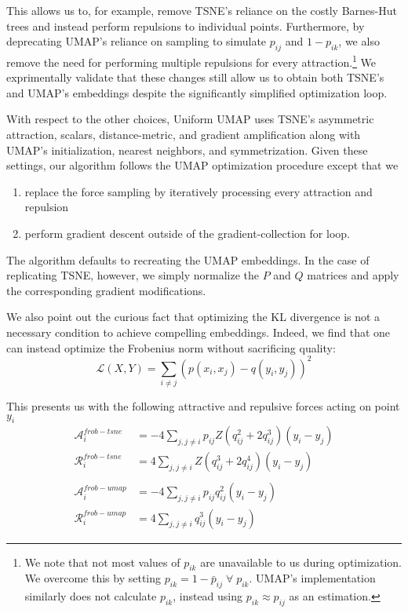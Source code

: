 \documentclass[sigconf, nonacm]{acmart}
\newcommand\ourmethod{Uniform UMAP }
\begin{document}
This allows us to, for example, remove TSNE's reliance on the costly Barnes-Hut trees and instead perform repulsions to individual points.
Furthermore, by deprecating UMAP's reliance on sampling to simulate $p_{ij}$ and $1 - p_{ik}$, we also remove the need for performing multiple repulsions for every
attraction.\footnote{We note that not most values of $p_{ik}$ are unavailable to us during optimization. We overcome this by setting $p_{ik} = 1 - \bar{p}_{ij}
\; \forall \; p_{ik}$. UMAP's implementation similarly does not calculate $p_{ik}$, instead using $p_{ik} \approx p_{ij}$ as an estimation.} We exprimentally
validate that these changes still allow us to obtain both TSNE's and UMAP's embeddings despite the significantly simplified optimization loop.

With respect to the other choices, \ourmethod  uses TSNE's asymmetric attraction, scalars, distance-metric, and gradient amplification along with UMAP's
initialization, nearest neighbors, and symmetrization. Given these settings, our algorithm follows the UMAP optimization procedure except that we
\begin{enumerate}
        \item replace the force sampling by iteratively processing every attraction and repulsion
        \item perform gradient descent outside of the gradient-collection for loop.
\end{enumerate}
The algorithm defaults to recreating the UMAP embeddings. In the case of replicating TSNE, however, we simply normalize the $P$ and $Q$ matrices and apply the
corresponding gradient modifications.

We also point out the curious fact that optimizing the KL divergence is not a necessary condition to achieve compelling embeddings. Indeed, we find that one can
instead optimize the Frobenius norm without sacrificing quality:
\[ \mathcal{L}(X, Y) = \sum_{i \neq j} (p(x_i, x_j) - q(y_i, y_j))^2 \]

This presents us with the following attractive and repulsive forces acting on point $y_i$
\begin{align*}
    \mathcal{A}_i^{frob-tsne} &= -4 \sum_{j, j \neq i} p_{ij} Z (q_{ij}^2 + 2q_{ij}^3) (y_i - y_j) \\
    \mathcal{R}_i^{frob-tsne} &= 4 \sum_{j, j \neq i} Z( q_{ij}^3 + 2q_{ij}^4) (y_i - y_j) \\
    &\\
    \mathcal{A}_i^{frob-umap} &= -4 \sum_{j, j \neq i} p_{ij} q_{ij}^2 (y_i - y_j) \\
    \mathcal{R}_i^{frob-umap} &= 4 \sum_{j, j \neq i} q_{ij}^3 (y_i - y_j)  
\end{align*}
\end{document}

